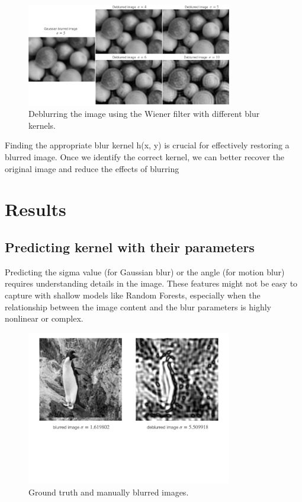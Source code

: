 \documentclass[twoside,11pt]{article}
\begin{document}
\begin{figure}[!ht]
\centering
\includegraphics[width=0.8\textwidth]{figure7.png}
\caption{Deblurring the image using the Wiener filter with different blur kernels.}
\end{figure}
Finding the appropriate blur kernel  h(x, y)  is crucial for effectively restoring a blurred image. Once we identify the correct kernel, we can better recover the original image and reduce the effects of blurring

\FloatBarrier 

\section{Results}
\subsection{Predicting kernel with their parameters}
Predicting the sigma value (for Gaussian blur) or the angle (for motion blur) requires understanding details in the image. These features might not be easy to capture with shallow models like Random Forests, especially when the relationship between the image content and the blur parameters is highly nonlinear or complex. 

\begin{figure}[H]
\centering
\includegraphics[width=0.8\textwidth]{figure8.png}
\caption{Ground truth and manually blurred images.}
\end{figure}
\end{document}
